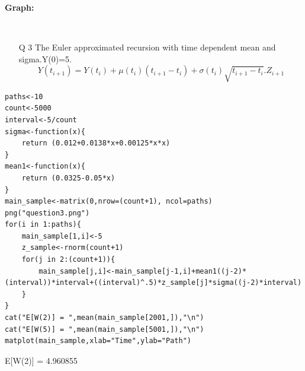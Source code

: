 \documentclass[11pt]{article}
\begin{document}
\newpage
\textbf{Graph: }\
\begin{figure}[H]
\centering
{}\\
\end{figure}
\newpage
\begin{enumerate}
\item[Q 3] The Euler approximated recursion with time dependent mean and sigma.Y(0)=5.
\[Y(t_{i+1}) = Y(t_i)+\mu(t_i)(t_{i+1}-t_{i})+\sigma(t_i)\sqrt{t_{i+1}-t_i}.Z_{i+1}\]
\end{enumerate}
\begin{lstlisting}
paths<-10
count<-5000
interval<-5/count
sigma<-function(x){
	return (0.012+0.0138*x+0.00125*x*x)
}
mean1<-function(x){
	return (0.0325-0.05*x)
}
main_sample<-matrix(0,nrow=(count+1), ncol=paths)
png("question3.png")
for(i in 1:paths){
	main_sample[1,i]<-5
	z_sample<-rnorm(count+1)
	for(j in 2:(count+1)){
		main_sample[j,i]<-main_sample[j-1,i]+mean1((j-2)*(interval))*interval+((interval)^.5)*z_sample[j]*sigma((j-2)*interval)
	}	
}
cat("E[W(2)] = ",mean(main_sample[2001,]),"\n")
cat("E[W(5)] = ",mean(main_sample[5001,]),"\n")
matplot(main_sample,xlab="Time",ylab="Path")
\end{lstlisting}

E[W(2)] =  4.960855\
\end{document}
